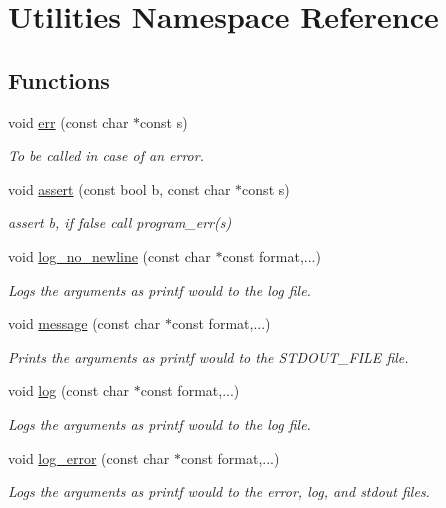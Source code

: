\hypertarget{namespace_utilities}{}\section{Utilities Namespace Reference}
\label{namespace_utilities}
\subsection*{Functions}
\begin{DoxyCompactItemize}
\item 
void \hyperlink{namespace_utilities_a5308da50597c93aad2b1ca2ecfbcb723}{err} (const char $\ast$const s)
\begin{DoxyCompactList}\small\item\em To be called in case of an error. \end{DoxyCompactList}\item 
void \hyperlink{namespace_utilities_a22c85a2970e168ca0b9ad6fd86752792}{assert} (const bool b, const char $\ast$const s)
\begin{DoxyCompactList}\small\item\em assert b, if false call program\+\_\+err(s) \end{DoxyCompactList}\item 
void \hyperlink{namespace_utilities_af31967f218e82230e887a5551e5c2d1e}{log\+\_\+no\+\_\+newline} (const char $\ast$const format,...)
\begin{DoxyCompactList}\small\item\em Logs the arguments as printf would to the log file. \end{DoxyCompactList}\item 
void \hyperlink{namespace_utilities_a0e46f2da74b1069eb9df671efed9180d}{message} (const char $\ast$const format,...)
\begin{DoxyCompactList}\small\item\em Prints the arguments as printf would to the S\+T\+D\+O\+U\+T\+\_\+\+F\+I\+LE file. \end{DoxyCompactList}\item 
void \hyperlink{namespace_utilities_a7e53321a2a9460f126a476a89b08107b}{log} (const char $\ast$const format,...)
\begin{DoxyCompactList}\small\item\em Logs the arguments as printf would to the log file. \end{DoxyCompactList}\item 
void \hyperlink{namespace_utilities_a48952d33b9dc4fba9846dbc7a12df2f1}{log\+\_\+error} (const char $\ast$const format,...)
\begin{DoxyCompactList}\small\item\em Logs the arguments as printf would to the error, log, and stdout files. \end{DoxyCompactList}\end{DoxyCompactItemize}


